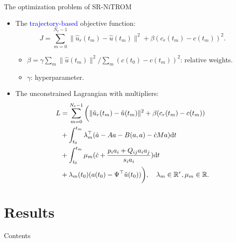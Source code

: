 \documentclass[presentation]{beamer}
\begin{document}
\begin{frame}[label={sec:orgdaac105}]{The optimization problem of SR-NiTROM}
\begin{itemize}[<+->]
\item The \textcolor{blue}{trajectory-based} objective function:
\begin{equation}
  \label{eq:4}
  J = \sum_{m = 0}^{N_{t} - 1}\|\hat{u}_{r}(t_{m}) - \hat{u}(t_{m})\|^{2} + \beta(c_{r}(t_{m}) - c(t_{m}))^{2}.
\end{equation}
\begin{itemize}
\item \(\beta = \gamma\sum_{m}\|\hat{u}(t_{m})\|^{2}/\sum_{m}(c(t_{0}) - c(t_{m}))^{2}\): relative weights.
\item \(\gamma\): hyperparameter.
\end{itemize}
\item The unconstrained Lagrangian with multipliers:
\begin{align}
  \label{eq:5}
  L &= \sum_{m = 0}^{N_{t} - 1}\bigg(\|\hat{u}_{r}(t_{m}) - \hat{u}(t_{m})\|^{2} + \beta(c_{r}(t_{m}) - c(t_{m}))\notag\\
    &+ \int_{t_{0}}^{t_{m}}\lambda_{m}^{\top}(\dot{a} - Aa - B(a,a) - \dot{c}Ma)\mathrm{d}t\\
    &+ \int_{t_{0}}^{t_{m}}\mu_{m}(\dot{c} + \frac{p_{i}a_{i} + Q_{ij}a_{i}a_{j}}{s_{i}a_{i}})\mathrm{d}t\\
    &+ \lambda_{m}(t_{0})(a(t_{0}) - \Psi^{\top}\hat{u}(t_{0}))\bigg), \quad \lambda_{m}\in\mathbb{R}^{r}, \mu_{m}\in\mathbb{R}.
\end{align}
\end{itemize}
\end{frame}

\section{Results}
\label{sec:org8c34e98}
\begin{frame}{Contents}
\end{frame}
\end{document}
